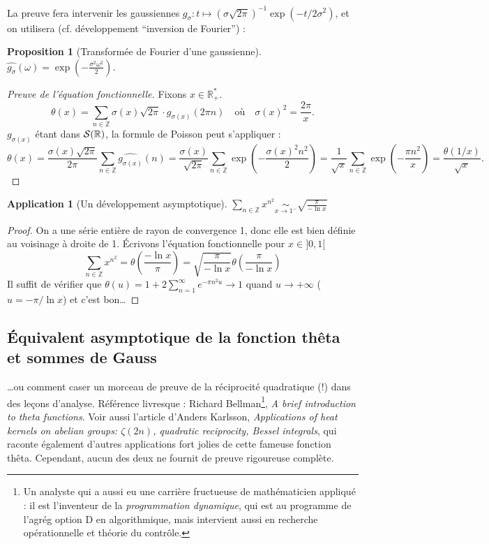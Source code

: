 \documentclass[a4paper, 11pt]{article}
\def\Z{\mathbb{Z}}
\def\R{\mathbb{R}}
\def\S{{\cal{S}}}
\newtheorem*{proposition}{Proposition}
\newtheorem*{application}{Application}
\begin{document}
La preuve fera intervenir les gaussiennes $g_\sigma : t \mapsto
(\sigma\sqrt{2\pi})^{-1} \exp(-t/2\sigma^2)$, et on utilisera (cf. développement
\enquote{inversion de Fourier}) :
\begin{proposition}[Transformée de Fourier d'une gaussienne]
  $\displaystyle \widehat{g_\sigma}(\omega) = \exp\left(- \frac{\sigma^2
      \omega^2}{2} \right)$. %
\end{proposition}

\begin{proof}[Preuve de l'équation fonctionnelle]
  Fixons $x \in \R_+^*$.
  \[ \theta(x) = \sum_{n \in \Z} \sigma(x)\sqrt{2\pi}
    \cdot g_{\sigma(x)}(2\pi n) \quad \text{où} \quad
    \sigma(x)^2 = \frac{2\pi}{x}.
  \]
  $g_{\sigma(x)}$ étant dans $\S(\R)$, la formule de Poisson peut s'appliquer :
  \[ \theta(x) =
    \frac{\sigma(x)\sqrt{2\pi}}{2\pi} \sum_{n \in \Z}
    \widehat{g_{\sigma(x)}}(n) =
    \frac{\sigma(x)}{\sqrt{2\pi}} \sum_{n \in \Z}
    \exp\left(-\frac{\sigma(x)^2 n^2}{2} \right) =
    \frac{1}{\sqrt{x}} \sum_{n \in \Z} \exp\left( -\frac{\pi n^2}{x} \right)
    = \frac{\theta(1/x)}{\sqrt{x}}.
  \]
\end{proof}

\begin{application}[Un développement asymptotique]
  $\displaystyle \sum_{n \in \Z} x^{n^2} \underset{x \to 1^-}{\sim}
  \sqrt{\frac{\pi}{- \ln x}}$
\end{application}
\begin{proof}
  On a une série entière de rayon de convergence 1, donc elle est bien définie
  au voisinage à droite de 1. Écrivons l'équation fonctionnelle pour $x \in
  ]0,1[$
  \[ \sum_{n \in \Z} x^{n^2} = \theta\left( \frac{- \ln x}{\pi} \right) =
      \sqrt{\frac{\pi}{- \ln x}} \theta\left( \frac{\pi}{- \ln x} \right)
  \]
  Il suffit de vérifier que $\displaystyle \theta(u) = 1 + 2 \sum_{n=1}^\infty
  e^{-\pi n^2 u}\to 1$ quand $u \to +\infty$ ($u = -\pi/\ln x$) et c'est bon…
\end{proof}

\newpage

\subsection{Équivalent asymptotique de la fonction thêta et sommes de Gauss}
\label{theta}

…ou comment caser un morceau de preuve de la réciprocité quadratique (!) dans
des leçons d'analyse. Référence livresque : Richard Bellman\footnote{Un analyste
  qui a aussi eu une carrière fructueuse de mathématicien appliqué : il est
  l'inventeur de la \emph{programmation dynamique}, qui est au programme de
  l'agrég option D en algorithmique, mais intervient aussi en recherche
  opérationnelle et théorie du contrôle.}, \emph{A brief introduction to theta
  functions}. Voir aussi l'article d'Anders Karlsson, \emph{Applications of heat
  kernels on abelian groups: $\zeta(2n)$, quadratic reciprocity, Bessel
  integrals}, qui raconte également d'autres applications fort jolies de cette
fameuse fonction thêta. Cependant, aucun des deux ne fournit de preuve
rigoureuse complète.\\
\end{document}
